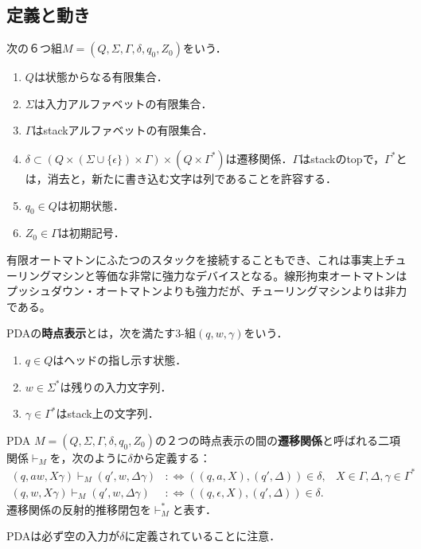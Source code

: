 \documentclass[uplatex, dvipdfmx]{jsreport}
\begin{document}
\subsection{定義と動き}

\begin{definition}
    次の６つ組$M=(Q,\Sigma,\Gamma,\delta,q_0,Z_0)$をいう．
    \begin{enumerate}
        \item $Q$は状態からなる有限集合．
        \item $\Sigma$は入力アルファベットの有限集合．
        \item $\Gamma$はstackアルファベットの有限集合．
        \item $\delta\subset(Q\times (\Sigma\cup\{\epsilon\})\times\Gamma)\times(Q\times\Gamma^*)$は遷移関係．$\Gamma$はstackのtopで，$\Gamma^*$とは，消去と，新たに書き込む文字は列であることを許容する．
        \item $q_0\in Q$は初期状態．
        \item $Z_0\in\Gamma$は初期記号．
    \end{enumerate}
\end{definition}
\begin{remark}[その他の抽象機械の設計法]
    有限オートマトンにふたつのスタックを接続することもでき、これは事実上チューリングマシンと等価な非常に強力なデバイスとなる。線形拘束オートマトンはプッシュダウン・オートマトンよりも強力だが、チューリングマシンよりは非力である。
\end{remark}

\begin{definition}
    PDAの\textbf{時点表示}とは，次を満たす3-組$(q,w,\gamma)$をいう．
    \begin{enumerate}
        \item $q\in Q$はヘッドの指し示す状態．
        \item $w\in\Sigma^*$は残りの入力文字列．
        \item $\gamma\in\Gamma^*$はstack上の文字列．
    \end{enumerate}
\end{definition}

\begin{definition}[遷移関係]
    PDA $M=(Q,\Sigma,\Gamma,\delta,q_0,Z_0)$の２つの時点表示の間の\textbf{遷移関係}と呼ばれる二項関係$\vdash_M$を，次のように$\delta$から定義する：
    \begin{align*}
        (q,aw,X\gamma)\vdash_M(q',w,\Delta\gamma)&:\Leftrightarrow((q,a,X),(q',\Delta))\in\delta,&X\in\Gamma,\Delta,\gamma\in\Gamma^*\\
        (q,w,X\gamma)\vdash_M(q',w,\Delta\gamma)&:\Leftrightarrow ((q,\epsilon,X),(q',\Delta))\in\delta.
    \end{align*}
    遷移関係の反射的推移閉包を$\vdash^*_M$と表す．
\end{definition}
\begin{remarks}
    PDAは必ず空の入力が$\delta$に定義されていることに注意．
\end{remarks}
\end{document}
